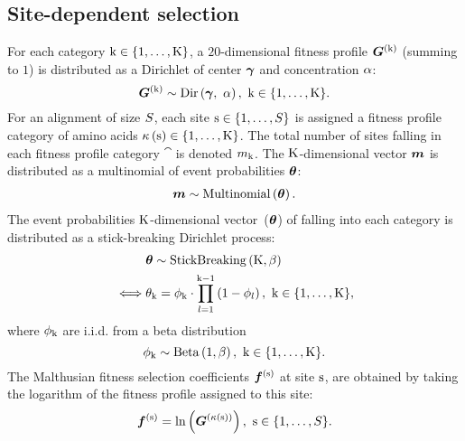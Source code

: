 \subsection{Site-dependent selection}
\label{sec:profiles}
For each category $\text{k} \in \{1, \hdots, \text{K}\}$, a $20$-dimensional fitness profile $\bm{G}^{(\text{k})}$ (summing to $1$) is distributed as a Dirichlet of center $\bm{\gamma}$ and concentration $\alpha$:
\begin{equation}
    \label{eq:DistribBase}
    \Base\catexp \sim \mathrm{Dir}\left( \Basecenter,\ \baseconc \right),\ \Setcat.
\end{equation}
For an alignment of size $S$, each site $\text{s} \in \{1, \hdots, S\}$ is assigned a fitness profile category of amino acids $\kappa\left(\text{s}\right) \in \{1, \hdots, \text{K}\} $.
The total number of sites falling in each fitness profile category $\cat$ is denoted $m_{\text{k}}$.
The $\text{K}$-dimensional vector $\bm{m}$ is distributed as a multinomial of event probabilities $\bm{\theta}$:
\begin{align}
    \label{eq:DistribMultinomial}
    \catMultiVar \sim \mathrm{Multinomial}\left( \StickBreaking \right).
\end{align}
The event probabilities $\text{K}$-dimensional vector~($\bm{\theta}$) of falling into each category is distributed as a stick-breaking \gls{Dirichlet process}:
\begin{align}
    \label{eq:DistribStickBreaking}
    \begin{split}
        & \StickBreaking \sim \mathrm{StickBreaking}\left( \Ncat, \stickbreakinghyper \right)\\
        \iff & \stickbreaking_{\cat} = \stick_{\cat}\cdot \prod _{{\indice=1}}^{{\cat-1}}\left(1-\stick_{\indice}\right),\ \Setcat,
    \end{split}
\end{align}
where $\phi_{\text{k}}$ are i.i.d.
from a beta distribution
\begin{equation}
    \label{eq:Beta}
    \stick_{\cat} \sim \mathrm{Beta}\left( 1, \stickbreakinghyper \right),\ \Setcat.
\end{equation}
The Malthusian fitness selection coefficients $\bm{f}^{(\text{s})}$ at site $\text{s}$, are obtained by taking the logarithm of the fitness profile assigned to this site:
\begin{equation}
    \label{eq:sitefitness}
    \Fit\siteexp = \ln \left( \Base^{\left( \catsite \right)} \right),\ \Setsite.
\end{equation}

